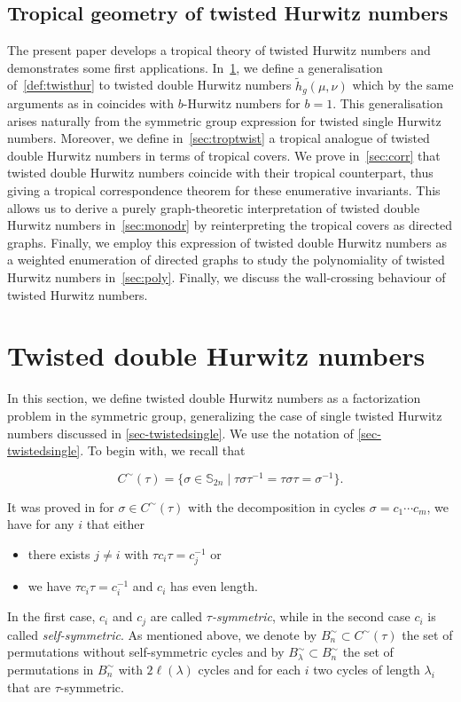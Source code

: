 \subsection{Tropical geometry of twisted Hurwitz numbers} 
The present paper develops a tropical theory of twisted Hurwitz numbers and demonstrates some first applications. In~\cref{sec:twistdoub}, we define a generalisation of~\cref{def:twisthur} to twisted double Hurwitz numbers $\tilde{h}_g(\mu,\nu)$ which by the same arguments as in \cite[Theorem 3.2]{BF21} coincides with $b$-Hurwitz numbers for $b=1$. This generalisation arises naturally from the symmetric group expression for twisted single Hurwitz numbers. Moreover, we define in~\cref{sec:troptwist} a tropical analogue of twisted double Hurwitz numbers in terms of tropical covers. We prove in~\cref{sec:corr} that twisted double Hurwitz numbers coincide with their tropical counterpart, thus giving a tropical correspondence theorem for these enumerative invariants. This allows us to derive a purely graph-theoretic interpretation of twisted double Hurwitz numbers in~\cref{sec:monodr} by reinterpreting the tropical covers as directed graphs.
Finally, we employ this expression of twisted double Hurwitz numbers as a weighted enumeration of directed graphs to study the polynomiality of twisted Hurwitz numbers in~\cref{sec:poly}. Finally, we discuss the wall-crossing behaviour of twisted Hurwitz numbers.

\section{Twisted double Hurwitz numbers}
\label{sec:twistdoub}
In this section, we define twisted double Hurwitz numbers as a factorization problem in the symmetric group, generalizing the case of single twisted Hurwitz numbers discussed in \cref{sec-twistedsingle}. We use the notation of \cref{sec-twistedsingle}. To begin with, we recall that

\begin{equation*}
     C^\sim(\tau)=\{\sigma\in \mathbb{S}_{2n}  \mid  \tau \sigma \tau^{-1} = \tau \sigma \tau =  \sigma^{-1}\}.
\end{equation*}

It was proved in \cite[Lemma 2.1]{BF21} for $\sigma \in C^\sim(\tau)$ with the decomposition in cycles $\sigma=c_1\cdots c_m$, we have for any $i$ that either
\begin{itemize}
    \item there exists $j\neq i$ with $\tau c_i\tau=c_j^{-1}$ or
    \item we have $\tau c_i\tau=c_i^{-1}$ and $c_i$ has even length.
\end{itemize}
In the first case, $c_i$ and $c_j$ are called \textit{$\tau$-symmetric}, while in the second case $c_i$ is called \textit{self-symmetric}. As mentioned above, we denote by $B_n^\sim\subset C^\sim(\tau)$ the set of permutations without self-symmetric cycles and by $B^\sim_\lambda\subset B^\sim_n$ the set of permutations in $B^\sim_n$ with $2\ell(\lambda)$ cycles and for each $i$ two cycles of length $\lambda_i$ that are $\tau$-symmetric.

